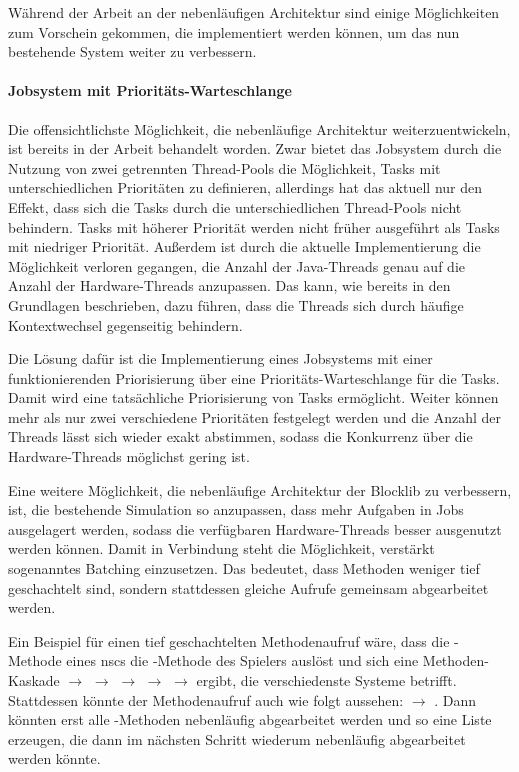 Während der Arbeit an der nebenläufigen Architektur sind einige Möglichkeiten zum Vorschein gekommen, die implementiert werden können, um das nun bestehende System weiter zu verbessern.
\paragraph{Jobsystem mit Prioritäts-Warteschlange}
Die offensichtlichste Möglichkeit, die nebenläufige Architektur weiterzuentwickeln, ist bereits in der Arbeit behandelt worden. Zwar bietet das Jobsystem durch die Nutzung von zwei getrennten Thread-Pools die Möglichkeit, Tasks mit unterschiedlichen Prioritäten zu definieren, allerdings hat das aktuell nur den Effekt, dass sich die Tasks durch die unterschiedlichen Thread-Pools nicht behindern. Tasks mit höherer Priorität werden nicht früher ausgeführt als Tasks mit niedriger Priorität. Außerdem ist durch die aktuelle Implementierung die Möglichkeit verloren gegangen, die Anzahl der Java-Threads genau auf die Anzahl der Hardware-Threads anzupassen. Das kann, wie bereits in den Grundlagen beschrieben, dazu führen, dass die Threads sich durch häufige Kontextwechsel gegenseitig behindern.

Die Lösung dafür ist die Implementierung eines Jobsystems mit einer funktionierenden Priorisierung über eine Prioritäts-Warteschlange für die Tasks. Damit wird eine tatsächliche Priorisierung von Tasks ermöglicht. Weiter können mehr als nur zwei verschiedene Prioritäten festgelegt werden und die Anzahl der Threads lässt sich wieder exakt abstimmen, sodass die Konkurrenz über die Hardware-Threads möglichst gering ist.

Eine weitere Möglichkeit, die nebenläufige Architektur der Blocklib zu verbessern, ist, die bestehende Simulation so anzupassen, dass mehr Aufgaben in Jobs ausgelagert werden, sodass die verfügbaren Hardware-Threads besser ausgenutzt werden können. Damit in Verbindung steht die Möglichkeit, verstärkt sogenanntes Batching einzusetzen. Das bedeutet, dass Methoden weniger tief geschachtelt sind, sondern stattdessen gleiche Aufrufe gemeinsam abgearbeitet werden.

\begin{example}
	Ein Beispiel für einen tief geschachtelten Methodenaufruf wäre, dass die -Methode eines \acsp{nsc} die -Methode des Spielers auslöst und sich eine Methoden-Kaskade  $\to$  $\to$  $\to$  $\to$  $\to$  ergibt, die verschiedenste Systeme betrifft. Stattdessen könnte der Methodenaufruf auch wie folgt aussehen:  $\to$ . Dann könnten erst alle 
-Methoden nebenläufig abgearbeitet werden und so eine Liste erzeugen, die dann im nächsten Schritt wiederum nebenläufig abgearbeitet werden könnte. 
\end{example}



